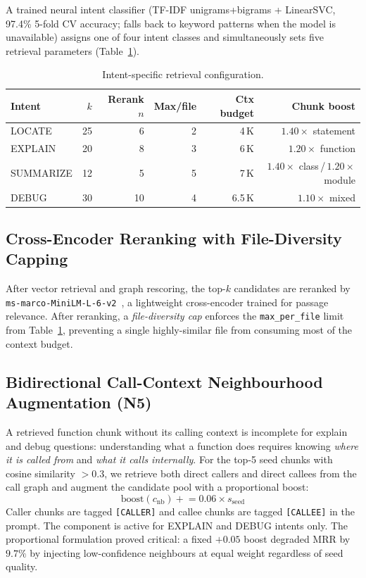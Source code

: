 \documentclass[runningheads]{llncs}
\begin{document}
A trained neural intent classifier (TF-IDF unigrams+bigrams +
LinearSVC, 97.4\% 5-fold CV accuracy; falls back to keyword
patterns when the model is unavailable) assigns one of four intent
classes and simultaneously sets five retrieval parameters
(Table~\ref{tab:intent_config}).

\begin{table}[t]
\centering
\caption{Intent-specific retrieval configuration.}
\label{tab:intent_config}
\footnotesize
\begin{tabular}{lrrrrr}
\toprule
Intent & $k$ & Rerank $n$ & Max/file & Ctx budget & Chunk boost \\
\midrule
LOCATE    & 25 & 6  & 2 & 4\,K  & $1.40\times$ statement \\
EXPLAIN   & 20 & 8  & 3 & 6\,K  & $1.20\times$ function  \\
SUMMARIZE & 12 & 5  & 5 & 7\,K  & $1.40\times$ class\,/\,$1.20\times$ module \\
DEBUG     & 30 & 10 & 4 & 6.5\,K& $1.10\times$ mixed     \\
\bottomrule
\end{tabular}
\end{table}

\subsection{Cross-Encoder Reranking with File-Diversity Capping}

After vector retrieval and graph rescoring, the top-$k$ candidates
are reranked by \texttt{ms-marco-MiniLM-L-6-v2}~\cite{reimers2019sentencebert},
a lightweight cross-encoder trained for passage relevance.
After reranking, a \emph{file-diversity cap} enforces the
\texttt{max\_per\_file} limit from Table~\ref{tab:intent_config},
preventing a single highly-similar file from consuming most of the
context budget.

\subsection{Bidirectional Call-Context Neighbourhood Augmentation (N5)}

A retrieved function chunk without its calling context is
incomplete for explain and debug questions: understanding what a
function does requires knowing \emph{where it is called from} and
\emph{what it calls internally}. For the top-5 seed chunks with
cosine similarity $>0.3$, we retrieve both direct callers and
direct callees from the call graph and augment the candidate pool
with a proportional boost:
\begin{equation}
\text{boost}(c_{\text{nb}})
  \mathrel{+}= 0.06 \times s_{\text{seed}}
\label{eq:callctx}
\end{equation}
Caller chunks are tagged \texttt{[CALLER]} and callee chunks are
tagged \texttt{[CALLEE]} in the prompt. The component is active
for EXPLAIN and DEBUG intents only. The proportional formulation
proved critical: a fixed $+0.05$ boost degraded MRR by $9.7\%$
by injecting low-confidence neighbours at equal weight regardless
of seed quality.
\end{document}
